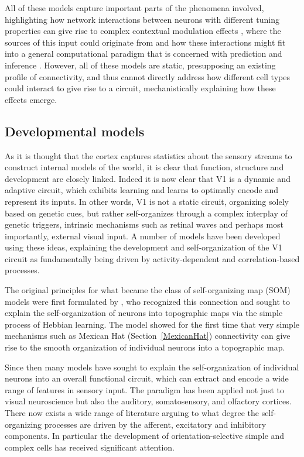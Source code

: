 All of these models capture important parts of the phenomena involved,
highlighting how network interactions between neurons with different
tuning properties can give rise to complex contextual modulation
effects \citep{Li2002}, where the sources of this input could
originate from \citep{Schwabe2006} and how these interactions might
fit into a general computational paradigm that is concerned with
prediction and inference \citep{Spratling2010, Coen2015}. However, all
of these models are static, presupposing an existing profile of
connectivity, and thus cannot directly address how different cell
types could interact to give rise to a circuit, mechanistically
explaining how these effects emerge.

\subsection{Developmental models} \label{devmodels}

As it is thought that the cortex captures statistics about the sensory
streams to construct internal models of the world, it is clear that
function, structure and development are closely linked. Indeed it is
now clear that V1 is a dynamic and adaptive circuit, which exhibits
learning and learns to optimally encode and represent its inputs. In
other words, V1 is not a static circuit, organizing solely based on
genetic cues, but rather self-organizes through a complex interplay of
genetic triggers, intrinsic mechanisms such as retinal waves and
perhaps most importantly, external visual input. A number of models
have been developed using these ideas, explaining the development and
self-organization of the V1 circuit as fundamentally being driven by
activity-dependent and correlation-based processes.

The original principles for what became the class of self-organizing
map (SOM) models were first formulated by \citep{VonderMalsburg1973},
who recognized this connection and sought to explain the
self-organization of neurons into topographic maps via the simple
process of Hebbian learning. The \cite{VonderMalsburg1973} model
showed for the first time that very simple mechanisms such as Mexican
Hat (Section~\ref{MexicanHat}) connectivity can give rise to the
smooth organization of individual neurons into a topographic map.

Since then many models have sought to explain the
self-organization of individual neurons into an overall functional
circuit, which can extract and encode a wide range of features in
sensory input. The paradigm has been applied not just to visual
neuroscience but also the auditory, somatosensory, and olfactory
cortices. There now exists a wide range of literature arguing to what
degree the self-organizing processes are driven by the afferent,
excitatory and inhibitory components. In particular the development of
orientation-selective simple and complex cells has received
significant attention.

